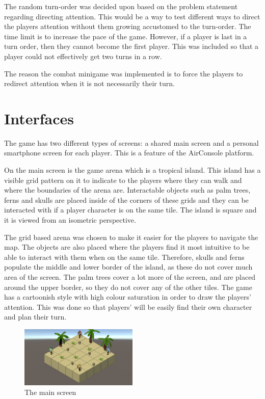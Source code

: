The random turn-order was decided upon based on the problem statement regarding directing attention. This would be a way to test different ways to direct the players attention without them growing accustomed to the turn-order. The time limit is to increase the pace of the game. However, if a player is last in a turn order, then they cannot become the first player. This was included so that a player could not effectively get two turns in a row.

The reason the combat minigame was implemented is to force the players to redirect attention when it is not necessarily their turn.

\section{Interfaces}
The game has two different types of screens: a shared main screen and a personal smartphone screen for each player. This is a feature of the AirConsole platform.

On the main screen is the game arena which is a tropical island. This island has a visible grid pattern on it to indicate to the players where they can walk and where the boundaries of the arena are. Interactable objects such as palm trees, ferns and skulls are placed inside of the corners of these grids and they can be interacted with if a player character is on the same tile. The island is square and it is viewed from an isometric perspective. 

The grid based arena was chosen to make it easier for the players to navigate the map. The objects are also placed where the players find it most intuitive to be able to interact with them when on the same tile. Therefore, skulls and ferns populate the middle and lower border of the island, as these do not cover much area of the screen. The palm trees cover a lot more of the screen, and are placed around the upper border, so they do not cover any of the other tiles. The game has a cartoonish style with high colour saturation in order to draw the players' attention. This was done so that players' will be easily find their own character and plan their  turn.

\begin{figure}
	\centering
	\includegraphics[width = 0.5\textwidth]{figures/MainScreen}
	\caption{The main screen}\label{fig:main_screen}
\end{figure}

